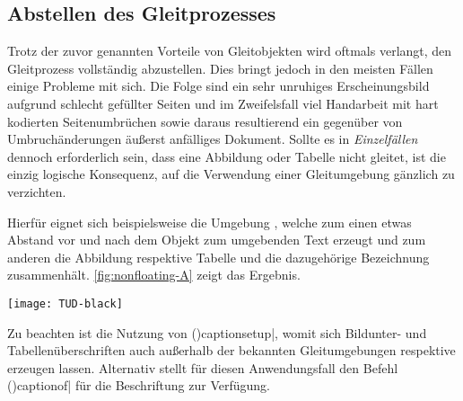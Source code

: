 \documentclass[%
  english,ngerman,%
  cdgeometry=no,DIV=12,%
  cd=false,cdfont=false,cdtitle=true,%
  headings=normal,%
  automark,%
  listof=toc,%
]{tudscrartcl}
\begin{document}
\subsection{Abstellen des Gleitprozesses}

Trotz der zuvor genannten Vorteile von Gleitobjekten wird oftmals verlangt, den 
Gleitprozess vollständig abzustellen. Dies bringt jedoch in den meisten Fällen 
einige Probleme mit sich. Die Folge sind ein sehr unruhiges Erscheinungsbild 
aufgrund schlecht gefüllter Seiten und im Zweifelsfall viel Handarbeit mit hart 
kodierten Seitenumbrüchen sowie daraus resultierend ein gegenüber von 
Umbruchänderungen äußerst anfälliges Dokument. Sollte es in \emph{Einzelfällen} 
dennoch erforderlich sein, dass eine Abbildung oder Tabelle nicht gleitet, ist 
die einzig logische Konsequenz, auf die Verwendung einer Gleitumgebung gänzlich 
zu verzichten. 

Hierfür eignet sich beispielsweise die Umgebung , welche 
zum einen etwas Abstand vor und nach dem Objekt zum umgebenden Text erzeugt 
und zum anderen die Abbildung respektive Tabelle und die dazugehörige 
Bezeichnung zusammenhält. \autoref{fig:nonfloating-A} zeigt das Ergebnis.
%
\begin{Hint}
\begin{center}
\captionsetup{type=figure}
\texttt{[image: TUD-black]}
\caption{%
  Eine nichtgleitende Abbildung in einer \texttt{center}-Umgebung%
  \label{fig:nonfloating-A}%
}
\end{center}

\end{Hint}
\InputCode\noindent
%
Zu beachten ist die Nutzung von 
\Macro(){captionsetup|}, womit
sich Bildunter- und Tabellenüberschriften auch außerhalb der bekannten 
Gleitumgebungen  respektive  erzeugen
lassen. Alternativ stellt \KOMAScript für diesen Anwendungsfall den Befehl 
\Macro(){captionof|}
für die Beschriftung zur Verfügung. 
\end{document}
